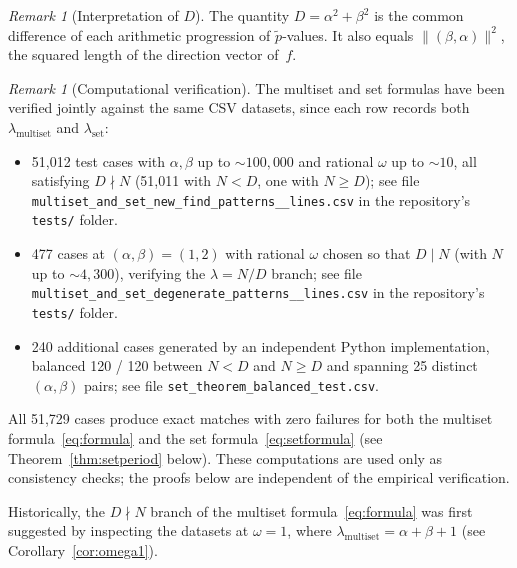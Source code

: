 \documentclass[11pt,reqno]{amsart}
\theoremstyle{plain}
\theoremstyle{definition}
\theoremstyle{remark}
\newtheorem{remark}[theorem]{Remark}
\begin{document}
\begin{remark}[Interpretation of \(D\)]\label{rem:D}
The quantity \(D = \alpha^2+\beta^2\) is the common difference of each
arithmetic progression of \(\tilde{p}\)-values.
It also equals \(\lVert(\beta,\alpha)\rVert^2\), the squared length of the
direction vector of~\(f\).
\end{remark}

\begin{remark}[Computational verification]\label{rem:verification}
The multiset and set formulas have been verified jointly against the same
CSV datasets, since each row records both \(\lambda_{\mathrm{multiset}}\)
and \(\lambda_{\mathrm{set}}\):
\begin{itemize}
    \item 51{,}012 test cases with \(\alpha, \beta\) up to \({\sim}100{,}000\)
          and rational \(\omega\) up to \({\sim}10\), all satisfying
          \(D \nmid N\) (51{,}011 with \(N < D\), one with \(N \ge D\));
          see file \texttt{multiset\_\allowbreak and\_\allowbreak set\_\allowbreak new\_\allowbreak find\_\allowbreak patterns\_\_\allowbreak lines.csv}
          in the repository's \texttt{tests/} folder.
    \item 477 cases at \((\alpha, \beta) = (1, 2)\) with rational \(\omega\)
          chosen so that \(D \mid N\) (with \(N\) up to \({\sim}4{,}300\)),
          verifying the \(\lambda = N/D\) branch; see file
          \texttt{multiset\_\allowbreak and\_\allowbreak set\_\allowbreak degenerate\_\allowbreak patterns\_\_\allowbreak lines.csv}
          in the repository's \texttt{tests/} folder.
    \item 240 additional cases generated by an independent Python
          implementation, balanced 120 / 120 between \(N < D\) and
          \(N \ge D\) and spanning 25 distinct \((\alpha, \beta)\) pairs;
          see file \texttt{set\_\allowbreak theorem\_\allowbreak balanced\_\allowbreak test.csv}.
\end{itemize}
All 51{,}729 cases produce exact matches with zero failures for both the
multiset formula~\eqref{eq:formula} and the set formula~\eqref{eq:setformula}
(see Theorem~\ref{thm:setperiod} below).  These computations are used only
as consistency checks; the proofs below are independent of the empirical
verification.

Historically, the \(D \nmid N\) branch of the multiset
formula~\eqref{eq:formula} was first suggested by inspecting the datasets
at \(\omega = 1\), where
\(\lambda_{\mathrm{multiset}} = \alpha + \beta + 1\)
(see Corollary~\ref{cor:omega1}).
\end{remark}
\end{document}
